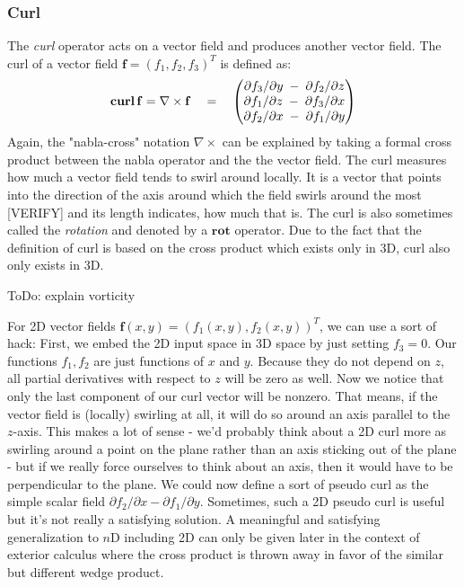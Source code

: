 \subsubsection{Curl}
The \emph{curl} operator acts on a vector field and produces another vector field. The curl of a vector field $\mathbf{f} = (f_1, f_2, f_3)^T$ is defined as:
\begin{equation}
 \operatorname{\mathbf{curl}} \mathbf{f} = \nabla \times \mathbf{f}  \quad = \quad
 \begin{pmatrix}
	\partial f_3 / \partial y \; - \; \partial f_2 / \partial z \\
	\partial f_1 / \partial z \; - \; \partial f_3 / \partial x \\
	\partial f_2 / \partial x \; - \; \partial f_1 / \partial y
\end{pmatrix} 
\end{equation}
Again, the "nabla-cross" notation  $\nabla \times$ can be explained by taking a formal cross product between the nabla operator and the the vector field. The curl measures how much a vector field tends to swirl around locally. It is a vector that points into the direction of the axis around which the field swirls around the most [VERIFY] and its length indicates, how much that is. The curl is also sometimes called the \emph{rotation} and denoted by a $\mathbf{rot}$ operator. Due to the fact that the definition of curl is based on the cross product which exists only in 3D, curl also only exists in 3D. 

ToDo: explain vorticity

\medskip
For 2D vector fields $\mathbf{f}(x,y) = (f_1(x,y), f_2(x,y))^T$, we can use a sort of hack: First, we embed the 2D input space in 3D space by just setting $f_3 = 0$. Our functions $f_1, f_2$ are just functions of $x$ and $y$.  Because they do not depend on $z$, all partial derivatives with respect to $z$ will be zero as well. Now we notice that only the last component of our curl vector will be nonzero. That means, if the vector field is (locally) swirling at all, it will do so around an axis parallel to the $z$-axis. This makes a lot of sense - we'd probably think about a 2D curl more as swirling around a point on the plane rather than an axis sticking out of the plane - but if we really force ourselves to think about an axis, then it would have to be perpendicular to the plane. We could now define a sort of pseudo curl as the simple scalar field $\partial f_2 / \partial x - \partial f_1 / \partial y$. Sometimes, such a 2D pseudo curl is useful but it's not really a satisfying solution. A meaningful and satisfying generalization to $n$D including 2D can only be given later in the context of exterior calculus where the cross product is thrown away in favor of the similar but different wedge product. 

